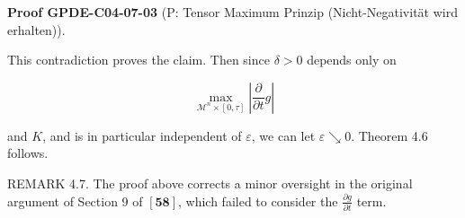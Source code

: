\documentclass[10pt, letterpaper]{article}
\newcommand{\CustomHeading}[3]{%
  \par\medskip\noindent%
  \textbf{#1 #2} \textnormal{(#3)}.\enskip%
}
\newenvironment{PROOF}[2]{\begin{unitbox}\CustomHeading{Proof}{#1}{#2}}{\end{unitbox}}
\begin{document}
\begin{PROOF}{GPDE-C04-07-03}{P: Tensor Maximum Prinzip (Nicht-Negativität wird erhalten)}
This contradiction proves the claim. Then since $\delta>0$ depends only on

$$
\max _{\mathcal{M}^n \times[0, \tau]}\left|\frac{\partial}{\partial t} g\right|
$$

and $K$, and is in particular independent of $\varepsilon$, we can let $\varepsilon \searrow 0$. Theorem 4.6 follows.
\end{PROOF}


REMARK 4.7. The proof above corrects a minor oversight in the original argument of Section 9 of $[\mathbf{5 8}]$, which failed to consider the $\frac{\partial g}{\partial t}$ term.





\pagebreak
\printbibliography
\end{document}
